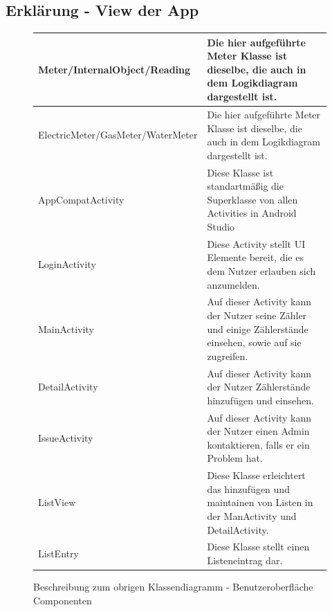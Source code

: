 \newpage

\subsection{Erklärung - View der App}
\begin{figure}[H]
	\begin{tabularx}{15cm}{XX}
		\hline 
		Meter/InternalObject/Reading & Die hier aufgeführte Meter Klasse ist dieselbe, die auch in dem Logikdiagram dargestellt ist. \\ \hline
		ElectricMeter/GasMeter/WaterMeter & Die hier aufgeführte Meter Klasse ist dieselbe, die auch in dem Logikdiagram dargestellt ist. \\ \hline
		AppCompatActivity & Diese Klasse ist standartmäßig die Superklasse von allen Activities in Android Studio \\ \hline
		LoginActivity & Diese Activity stellt UI Elemente bereit, die es dem Nutzer erlauben sich anzumelden. \\ \hline
		MainActivity & Auf dieser Activity kann der Nutzer seine Zähler und einige Zählerstände einsehen, sowie auf sie zugreifen. \\ \hline
		DetailActivity & Auf dieser Activity kann der Nutzer Zählerstände hinzufügen und einsehen. \\ \hline
		IssueActivity & Auf dieser Activity kann der Nutzer einen Admin kontaktieren, falls er ein Problem hat. \\ \hline
		ListView & Diese Klasse erleichtert das hinzufügen und maintainen von Listen in der ManActivity und DetailActivity. \\ \hline
		ListEntry & Diese Klasse stellt einen Listeneintrag dar. 
	\end{tabularx}
	\caption{Beschreibung zum obrigen Klassendiagramm - Benutzeroberfläche Componenten}
\end{figure}